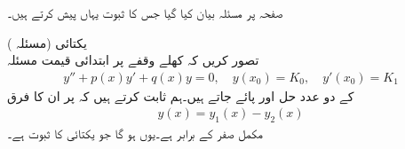 صفحہ  پر مسئلہ  بیان کیا گیا جس کا ثبوت یہاں پیش کرتے ہیں۔

\quad یکتائی (مسئلہ )\\
تصور کریں کہ کھلے وقفے  پر ابتدائی قیمت مسئلہ
\begin{align}\label{مساوات_ضمیمہ_خطی_متجانس_تفرقی_الف}
y''+p(x)y'+q(x)y=0, \quad y(x_0)=K_0,\quad y'(x_0)=K_1
\end{align}
کے دو عدد حل  اور  پائے جاتے ہیں۔ہم ثابت کرتے ہیں کہ  پر ان کا فرق
\begin{align*}
y(x)=y_1(x)-y_2(x)
\end{align*}
مکمل صفر کے برابر ہے۔یوں  ہو گا جو یکتائی کا ثبوت ہے۔


